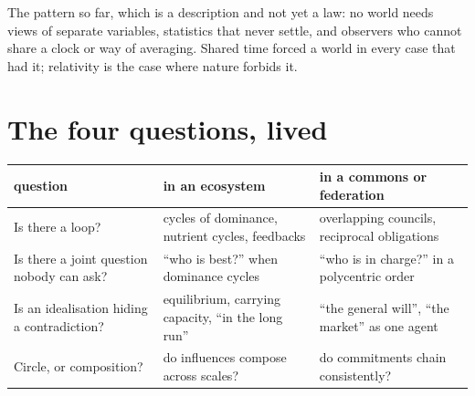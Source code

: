 \documentclass[11pt]{article}
\begin{document}
The pattern so far, which is a description and not yet a law: no world needs
views of separate variables, statistics that never settle, and observers who
cannot share a clock or way of averaging. Shared time forced a world in every
case that had it; relativity is the case where nature forbids it.

\section{The four questions, lived}
\begin{center}\small
\begin{tabular}{|>{\raggedright\arraybackslash}p{3.9cm}|>{\raggedright\arraybackslash}p{4.6cm}|>{\raggedright\arraybackslash}p{4.6cm}|}
\hline
\textbf{question} & \textbf{in an ecosystem} & \textbf{in a commons or federation}\\\hline
Is there a loop? & cycles of dominance, nutrient cycles, feedbacks & overlapping councils, reciprocal obligations\\\hline
Is there a joint question nobody can ask? & ``who is best?'' when dominance cycles & ``who is in charge?'' in a polycentric order\\\hline
Is an idealisation hiding a contradiction? & equilibrium, carrying capacity, ``in the long run'' & ``the general will'', ``the market'' as one agent\\\hline
Circle, or composition? & do influences compose across scales? & do commitments chain consistently?\\\hline
\end{tabular}
\end{center}
\end{document}
